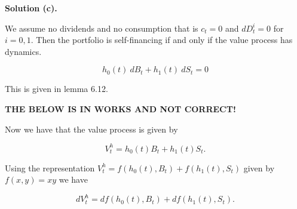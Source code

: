 \documentclass[a4paper,12pt,openany]{book}
\begin{document}
\textbf{Solution (c).}

We assume no dividends and no consumption that is \(c_t=0\) and \(dD_t^i=0\) for \(i=0,1\). Then the portfolio is self-financing if and only if the value process has dynamics.

\[
h_0(t)\ dB_t+h_1(t)\ dS_t=0
\]

This is given in lemma 6.12.

\textbf{THE BELOW IS IN WORKS AND NOT CORRECT!}

Now we have that the value process is given by

\[
V_t^h=h_0(t)B_t+h_1(t)S_t.
\]

Using the representation \(V_t^h=f(h_0(t),B_t)+f(h_1(t),S_t)\) given by \(f(x,y)=xy\) we have

\[
dV_t^h=df(h_0(t),B_t)+df(h_1(t),S_t).
\]
\end{document}
